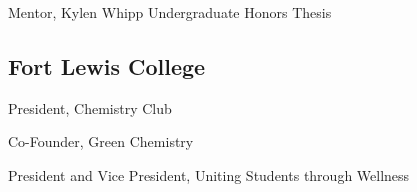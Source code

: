 \begin{description}
\tightlist
\item[2010 - 2011]
Mentor, Kylen Whipp Undergraduate Honors Thesis
\end{description}

\subsection{Fort Lewis College}\label{fort-lewis-college-1}

\begin{description}
\tightlist
\item[2003 - 2004]
President, Chemistry Club
\item[2002 - 2004]
Co-Founder, Green Chemistry
\item[2002 - 2004]
President and Vice President, Uniting Students through Wellness
\end{description}
